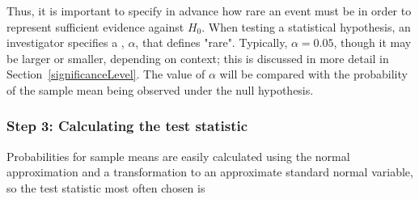 \begin{spacing}{1.5}
Thus, it is important to specify in advance how rare an event must be in order to represent sufficient evidence against $H_0$. When testing a statistical hypothesis, an investigator specifies a , $\alpha$, that defines "rare". Typically, $\alpha = 0.05$, though it may be larger or smaller, depending on context; this is discussed in more detail in Section~\ref{significanceLevel}. The value of $\alpha$ will be compared with the probability of the sample mean being observed under the null hypothesis.

\subsubsection{Step 3: Calculating the test statistic}

Probabilities for sample means are easily calculated using the normal approximation and a transformation to an approximate standard normal variable, so the test statistic most often chosen is 


\end{spacing}
